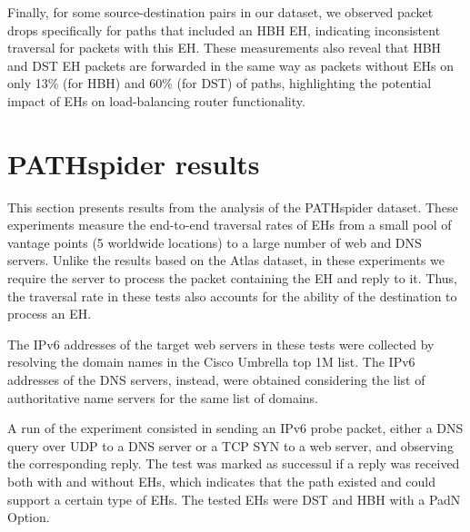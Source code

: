 \documentclass[conference]{IEEEtran}
\begin{document}
Finally, for some source-destination pairs in our dataset, we observed packet drops
specifically for paths that included an HBH EH, indicating inconsistent
traversal for packets with this EH. These measurements also reveal that HBH and DST
EH packets are forwarded in the same way as packets without EHs on only 13\%
(for HBH) and 60\% (for DST) of paths, highlighting the potential impact of EHs
on load-balancing router functionality.



 
\section{PATHspider results} 
\label{sec:pathspider-results}

This section presents results from the analysis of the PATHspider dataset.
These experiments measure the end-to-end traversal rates of EHs from a small
pool of vantage points (5 worldwide locations) to a large number of web and
DNS servers.  Unlike the results based on the Atlas dataset, in these
experiments we require the server to process the packet containing the EH and
reply to it. Thus, the traversal rate in these tests also accounts for the ability
of the destination to process an EH.

The IPv6 addresses of the target web servers in these tests were collected by
resolving the domain names in the Cisco Umbrella top 1M list. The IPv6
addresses of the DNS servers, instead, were obtained considering the list of
authoritative name servers for the same list of domains.

A run of the experiment consisted in sending an IPv6 probe packet, either a DNS
query over UDP to a DNS server or a TCP SYN to a web server, and observing the
corresponding reply.  The test was marked as successul if a reply was received
both with and without EHs, which indicates that the path existed and could
support a certain type of EHs.  The tested EHs were DST and HBH with a PadN Option.

\end{document}
